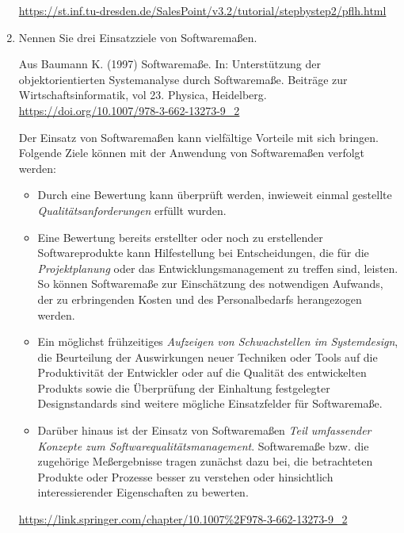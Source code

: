\documentclass{bschlangaul-aufgabe}
\begin{document}
\begin{enumerate}
\begin{bAntwort}
\url{https://st.inf.tu-dresden.de/SalesPoint/v3.2/tutorial/stepbystep2/pflh.html}
\end{bAntwort}


\item Nennen Sie drei Einsatzziele von Softwaremaßen.

\begin{bAntwort}
Aus
Baumann K. (1997) Softwaremaße. In: Unterstützung der objektorientierten
Systemanalyse durch Softwaremaße. Beiträge zur Wirtschaftsinformatik,
vol 23. Physica, Heidelberg. \url{https://doi.org/10.1007/978-3-662-13273-9_2}

Der Einsatz von Softwaremaßen kann vielfältige Vorteile mit sich
bringen. Folgende Ziele können mit der Anwendung von Softwaremaßen
verfolgt werden:

\begin{itemize}
\item Durch eine Bewertung kann überprüft werden, inwieweit einmal
gestellte \emph{Qualitätsanforderungen} erfüllt wurden.

\item Eine Bewertung bereits erstellter oder noch zu erstellender
Softwareprodukte kann Hilfestellung bei Entscheidungen, die für die
\emph{Projektplanung} oder das Entwicklungsmanagement zu treffen sind,
leisten. So können Softwaremaße zur Einschätzung des notwendigen
Aufwands, der zu erbringenden Kosten und des Personalbedarfs
herangezogen werden.

\item Ein möglichst frühzeitiges \emph{Aufzeigen von Schwachstellen im
Systemdesign}, die Beurteilung der Auswirkungen neuer Techniken oder
Tools auf die Produktivität der Entwickler oder auf die Qualität des
entwickelten Produkts sowie die Überprüfung der Einhaltung festgelegter
Designstandards sind weitere mögliche Einsatzfelder für Softwaremaße.

\item Darüber hinaus ist der Einsatz von Softwaremaßen \emph{Teil
umfassender Konzepte zum Softwarequalitätsmanagement}. Softwaremaße bzw.
die zugehörige Meßergebnisse tragen zunächst dazu bei, die betrachteten
Produkte oder Prozesse besser zu verstehen oder hinsichtlich
interessierender Eigenschaften zu bewerten.
\end{itemize}

\url{https://link.springer.com/chapter/10.1007%2F978-3-662-13273-9_2}
\end{bAntwort}


\end{enumerate}
\end{document}
